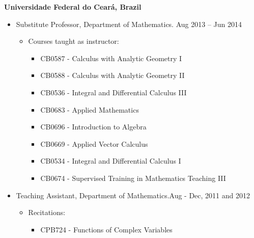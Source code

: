 \documentclass[10pt]{article}
\newenvironment{outerlist}[1][\enskip\textbullet]%
        {\begin{itemize}[#1,leftmargin=*]}{\end{itemize}%
         \vspace{-.6\baselineskip}}
\newenvironment{innerlist}[1][\enskip\textbullet]%
        {\begin{itemize}[#1,leftmargin=*,parsep=0pt,itemsep=0pt,topsep=0pt,partopsep=0pt]}
        {\end{itemize}}
\begin{document}
\vspace{1cm}
                                   
\textbf{Universidade Federal do Cear\'a, Brazil} 

\begin{outerlist}
\item[]Substitute Professor, Department of Mathematics. \hfill {Aug 2013 -- Jun 2014} 
\begin{innerlist}
                 \item[]Courses taught as instructor:
                                       \begin{innerlist}
                                                        \item[]CB0587 - Calculus with Analytic Geometry I
                                                        \item[]CB0588 - Calculus with Analytic Geometry II
                                                        \item[]CB0536 - Integral and Differential Calculus III
                                                        \item[]CB0683 - Applied Mathematics
                                                        \item[]CB0696 - Introduction to Algebra
                                                        \item[]CB0669 - Applied Vector Calculus
                                                        \item[]CB0534 - Integral and Differential Calculus I
                                                        \item[]CB0674 - Supervised Training in Mathematics Teaching III
                                        \end{innerlist}
\end{innerlist}
\vspace{1cm}

\item[] Teaching Assistant, Department of Mathematics.\hfill {Aug - Dec, 2011 and 2012}
\begin{innerlist}
                 \item[] Recitations:
                 \begin{innerlist}
                                  \item[]CPB724 - Functions of Complex Variables
                 \end{innerlist}  
\end{innerlist}

\end{outerlist}
\end{document}
